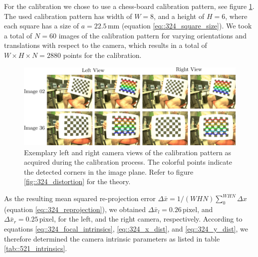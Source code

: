 For the calibration we chose to use a chess-board calibration pattern, see figure \ref{fig::521_calib}. The used calibration pattern has width of $W=8$, and a height of $H=6$, where each square has a size of $a=22.5\,\text{mm}$ (equation \ref{eq::324_square_size}). We took a total of $N=60$ images of the calibration pattern for varying orientations and translations with respect to the camera, which results in a total of $W\times H\times N = 2880$ points for the calibration. 
\begin{figure}[h]
	\centering
	\includegraphics[scale=.28]{chapters/05_experiments/02_autonomous_walking/01_camera_calibration/calib.png}
	\caption{Exemplary left and right camera views of the calibration pattern as acquired during the calibration process. The colorful points indicate the detected corners in the image plane. Refer to figure \ref{fig::324_distortion} for the theory.}
	\label{fig::521_calib}
\end{figure}
As the resulting mean squared re-projection error $\Delta \bar{x} = 1/(WHN)\sum_0^{WHN} \Delta x$ (equation \ref{eq::324_reprojection}), we obtained $\Delta \bar{x}_l = 0.26\, \text{pixel}$, and $\Delta \bar{x}_r = 0.25\,\text{pixel}$, for the left, and the right camera, respectively. According to equations \ref{eq::324_focal_intrinsics}, \ref{eq::324_x_dist}, and \ref{eq::324_y_dist}, we therefore determined the camera intrinsic parameters as listed in table \ref{tab::521_intrinsics}.
